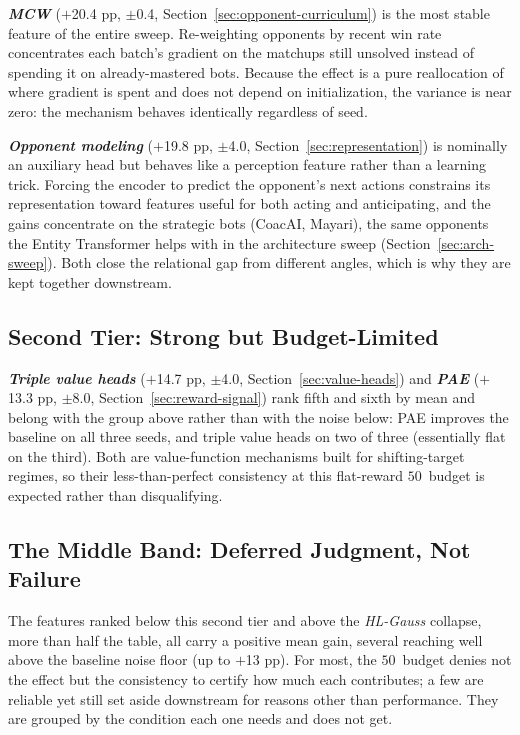 \emph{\textbf{MCW}} ($+$20.4 pp, $\pm$0.4, Section~\ref{sec:opponent-curriculum}) is the most stable feature of the entire sweep. Re-weighting opponents by recent win rate concentrates each batch's gradient on the matchups still unsolved instead of spending it on already-mastered bots. Because the effect is a pure reallocation of where gradient is spent and does not depend on initialization, the variance is near zero: the mechanism behaves identically regardless of seed.

\emph{\textbf{Opponent modeling}} ($+$19.8 pp, $\pm$4.0, Section~\ref{sec:representation}) is nominally an auxiliary head but behaves like a perception feature rather than a learning trick. Forcing the encoder to predict the opponent's next actions constrains its representation toward features useful for both acting and anticipating, and the gains concentrate on the strategic bots (CoacAI, Mayari), the same opponents the Entity Transformer helps with in the architecture sweep (Section~\ref{sec:arch-sweep}). Both close the relational gap from different angles, which is why they are kept together downstream.

\vspace*{-0.1cm}

\subsection{Second Tier: Strong but Budget-Limited}

\emph{\textbf{Triple value heads}} ($+$14.7 pp, $\pm$4.0, Section~\ref{sec:value-heads}) and \emph{\textbf{PAE}} ($+$13.3 pp, $\pm$8.0, Section~\ref{sec:reward-signal}) rank fifth and sixth by mean and belong with the group above rather than with the noise below: PAE improves the baseline on all three seeds, and triple value heads on two of three (essentially flat on the third). Both are value-function mechanisms built for shifting-target regimes, so their less-than-perfect consistency at this flat-reward $50$\, budget is expected rather than disqualifying.

\vspace*{-0.1cm}

\subsection{The Middle Band: Deferred Judgment, Not Failure}

The features ranked below this second tier and above the \emph{HL-Gauss} collapse, more than half the table, all carry a positive mean gain, several reaching well above the baseline noise floor (up to $+$13 pp). For most, the $50$\, budget denies not the effect but the consistency to certify how much each contributes; a few are reliable yet still set aside downstream for reasons other than performance. They are grouped by the condition each one needs and does not get.

